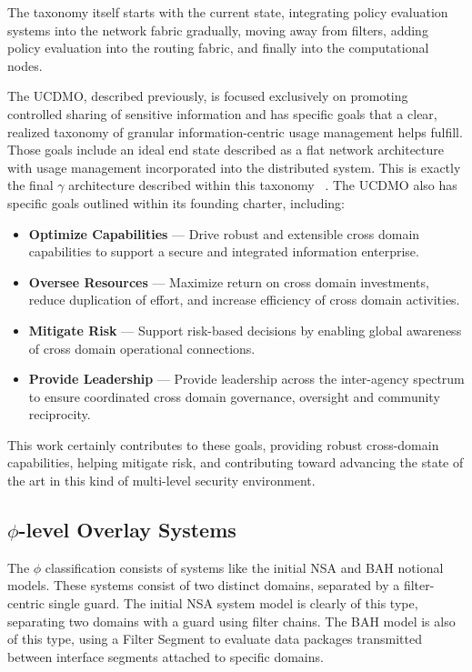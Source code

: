 The taxonomy itself starts with the current state, integrating policy evaluation systems into the network fabric gradually, moving away from filters, adding policy evaluation into the routing fabric, and finally into the computational nodes.

The UCDMO, described previously, is focused exclusively on promoting controlled sharing of sensitive information and has specific goals that a clear, realized taxonomy of granular information-centric usage management helps fulfill.  Those goals include an ideal end state described as a flat network architecture with usage management incorporated into the distributed system.  This is exactly the final $\gamma$ architecture described within this taxonomy ~\cite{proposal:cd101,proposal:ucdmo-goals}.  The UCDMO also has specific goals outlined within its founding charter, including:

\begin{itemize}
\item \textbf{Optimize Capabilities} ---  Drive robust and extensible cross domain capabilities to support a secure and integrated information enterprise.
\item \textbf{Oversee Resources} ---  Maximize return on cross domain investments, reduce duplication of effort, and increase efficiency of cross domain activities.
\item \textbf{Mitigate Risk} ---  Support risk-based decisions by enabling global awareness of cross domain operational connections.
\item \textbf{Provide Leadership} ---  Provide leadership across the inter-agency spectrum to ensure coordinated cross domain governance, oversight and community reciprocity.
\end{itemize}

This work certainly contributes to these goals, providing robust cross-domain capabilities, helping mitigate risk, and contributing toward advancing the state of the art in this kind of multi-level security environment.

\subsection{$\phi$-level Overlay Systems}
The $\phi$ classification consists of systems like the initial NSA and BAH notional models.  These systems consist of two distinct domains, separated by a filter-centric single guard.  The initial NSA system model is clearly of this type, separating two domains with a guard using filter chains.  The BAH model is also of this type, using a Filter Segment to evaluate data packages transmitted between interface segments attached to specific domains.


